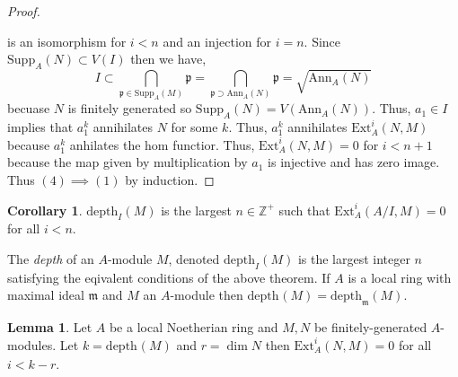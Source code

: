 \documentclass[12pt]{article}
\newcommand{\Z}{\mathbb{Z}}
\newcommand{\Ext}[4]{\mathrm{Ext}^{#1}_{#2} \left( #3, #4 \right)}
\newcommand{\Ann}[2]{\mathrm{Ann}_{#1}\left(#2\right)}
\newcommand{\supp}[2]{\mathrm{Supp}_{#1} \left( #2 \right) }
\newcommand{\Supp}[2]{\mathrm{Supp}_{#1}\left( #2 \right)}
\newcommand{\depth}[2]{\mathrm{depth}_{#1}\left(#2\right)}
\newcommand{\p}{\mathfrak{p}}
\newcommand{\m}{\mathfrak{m}}
\theoremstyle{remark}
\theoremstyle{definition}
\newtheorem{lemma}[theorem]{Lemma}
\newtheorem{corollary}[theorem]{Corollary}
\newenvironment{definition}[1][Definition:]{\begin{trivlist}
\item[\hskip \labelsep {\bfseries #1}]}{\end{trivlist}}
\begin{document}
\begin{proof}
\begin{center}
\end{center}
is an isomorphism for $i < n$ and an injection for $i = n$. 
Since $\supp{A}{N} \subset V(I)$ then we have,
\[ 
I \subset \bigcap_{\p \in \Supp{A}{M}} \p = \bigcap_{\p \supset \Ann{A}{N}} \p = \sqrt{\Ann{A}{N}} \]
becuase $N$ is finitely generated so $\Supp{A}{N} = V(\Ann{A}{N})$. 
Thus, $a_1 \in I$ implies that $a_1^k$ annihilates $N$ for some $k$. Thus, $a_1^k$ annihilates $\Ext{i}{A}{N}{M}$ because $a_1^k$ anhilates the hom functior. Thus, $\Ext{i}{A}{N}{M} = 0$ for $i < n + 1$ because the map given by multiplication by $a_1$ is injective and has zero image. Thus $(4) \implies (1)$ by induction.
\end{proof}

\begin{corollary}
$\depth{I}{M}$ is the largest $n \in \Z^{+}$ such that $\Ext{i}{A}{A/I}{M} = 0$ for all $i < n$. 
\end{corollary}


\begin{definition}
The \textit{depth} of an $A$-module $M$, denoted $\depth{I}{M}$ is the largest integer $n$ satisfying the eqivalent conditions of the above theorem. If $A$ is a local ring with maximal ideal $\m$ and $M$ an $A$-module then $\depth{}{M} = \depth{\m}{M}$. 
\end{definition}

\begin{lemma}
Let $A$ be a local Noetherian ring and $M,N$ be finitely-generated $A$-modules. Let $k = \depth{}{M}$ and $r = \dim{N}$ then $\Ext{i}{A}{N}{M} = 0$ for all $i < k - r$. 
\end{lemma}
\end{document}
